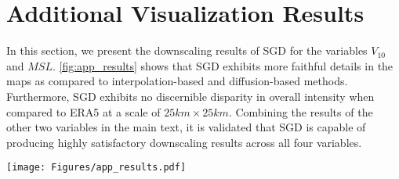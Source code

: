 \section{Additional Visualization Results}
In this section, we present the downscaling results of SGD for the variables $V_{10}$ and $MSL$. 
\cref{fig:app_results} shows that SGD exhibits more faithful details in the maps as compared to interpolation-based and diffusion-based methods. 
Furthermore, SGD exhibits no discernible disparity in overall intensity when compared to ERA5 at a scale of $25km\times 25km$. 
Combining the results of the other two variables in the main text, it is validated that SGD is capable of producing highly satisfactory downscaling results across all four variables. 

\begin{figure*}[t]
    \centering
\texttt{[image: Figures/app\_results.pdf]}
    \caption{Visualization comparison of different interpolation-based and diffusion-based downscaling results in various time stamps. 
    We use different colors to distinguish $V_{10}$ and $MSL$. }
    \label{fig:app_results}
\end{figure*}